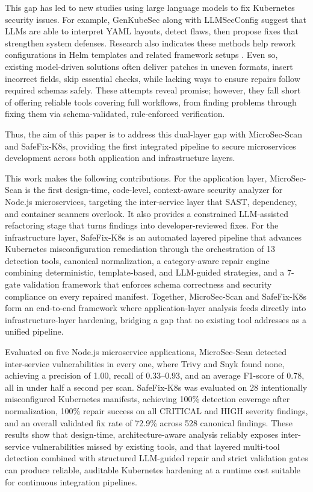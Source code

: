 \documentclass[preprint,12pt]{elsarticle}
\newcommand{\new}[1]{#1}
\begin{document}
This gap has led to new studies using large language models to fix Kubernetes security issues. For example, GenKubeSec \cite{malul2024genkubesec} along with LLMSecConfig \cite{ye2025llmsecconfig} suggest that LLMs are able to interpret YAML layouts, detect flaws, then propose fixes that strengthen system defenses. Research also indicates these methods help rework configurations in Helm templates and related framework setups \cite{minna2025helmllm}. Even so, existing model-driven solutions often deliver patches in uneven formats, insert incorrect fields, skip essential checks, while lacking ways to ensure repairs follow required schemas safely. These attempts reveal promise; however, \new{they fall short of offering reliable tools covering full workflows, from finding problems through fixing them via schema-validated, rule-enforced verification.}


Thus, the aim of this paper is to address this dual-layer gap with MicroSec-Scan  and SafeFix-K8s, providing the first integrated pipeline to secure microservices development across both application and infrastructure layers.


\new{This work makes the following contributions. For the application layer, 
MicroSec-Scan is the first design-time, code-level, context-aware security 
analyzer for Node.js microservices, targeting the inter-service layer that 
SAST, dependency, and container scanners overlook. It also provides a 
constrained LLM-assisted refactoring stage that turns findings into 
developer-reviewed fixes. For the infrastructure layer, SafeFix-K8s is an 
automated layered pipeline that advances Kubernetes misconfiguration 
remediation through the orchestration of 13 detection tools, canonical 
normalization, a category-aware repair engine combining deterministic, 
template-based, and LLM-guided strategies, and a 7-gate validation framework 
that enforces schema correctness and security compliance on every repaired 
manifest. Together, MicroSec-Scan and SafeFix-K8s form an end-to-end 
framework where application-layer analysis feeds directly into 
infrastructure-layer hardening, bridging a gap that no existing tool 
addresses as a unified pipeline.}

\new{Evaluated on five Node.js microservice applications, MicroSec-Scan 
detected inter-service vulnerabilities in every one, where Trivy and Snyk 
found none, achieving a precision of 1.00, recall of 0.33--0.93, and an 
average F1-score of 0.78, all in under half a second per scan. SafeFix-K8s 
was evaluated on 28 intentionally misconfigured Kubernetes manifests, 
achieving 100\% detection coverage after normalization, 100\% repair success 
on all CRITICAL and HIGH severity findings, and an overall validated fix rate 
of 72.9\% across 528 canonical findings. These results show that design-time, 
architecture-aware analysis reliably exposes inter-service vulnerabilities 
missed by existing tools, and that layered multi-tool detection combined with 
structured LLM-guided repair and strict validation gates can produce 
reliable, auditable Kubernetes hardening at a runtime cost suitable for 
continuous integration pipelines.}
\end{document}

